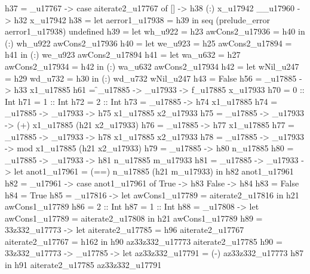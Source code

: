          h37 = _u17767 -> case aiterate2_u17767 of
                                      [] -> h38
                                      (:) x_u17942 __u17960 -> h32 x_u17942
         h38 = let aerror1_u17938 = h39
               in seq (prelude_error aerror1_u17938) undefined
         h39 = let
                 wh_u922 = h23
                 awCons2_u17936 = h40
               in (:) wh_u922 awCons2_u17936
         h40 = let
                 we_u923 = h25
                 awCons2_u17894 = h41
               in (:) we_u923 awCons2_u17894
         h41 = let
                 wa_u632 = h27
                 awCons2_u17934 = h42
               in (:) wa_u632 awCons2_u17934
         h42 = let
                 wNil_u247 = h29
                 wd_u732 = h30
               in (:) wd_u732 wNil_u247
         h43 = False
         h56 = _u17885 -> h33 x1_u17885
         h61 = \f_u17885 -> \x_u17933 -> f_u17885 x_u17933
         h70 = 0 :: Int
         h71 = 1 :: Int
         h72 = 2 :: Int
         h73 = _u17885 -> h74 x1_u17885
         h74 = _u17885 -> _u17933 -> h75 x1_u17885 x2_u17933
         h75 = _u17885 -> _u17933 -> (+) x1_u17885 (h21 x2_u17933)
         h76 = _u17885 -> h77 x1_u17885
         h77 = _u17885 -> _u17933 -> h78 x1_u17885 x2_u17933
         h78 = _u17885 -> _u17933 -> mod x1_u17885 (h21 x2_u17933)
         h79 = \n_u17885 -> h80 n_u17885
         h80 = \n_u17885 -> \m_u17933 -> h81 n_u17885 m_u17933
         h81 = \n_u17885 -> \m_u17933 -> let
                                           anot1_u17961 = (==) n_u17885 (h21 m_u17933)
                                         in h82 anot1_u17961
         h82 = _u17961 -> case anot1_u17961 of
                                  True -> h83
                                  False -> h84
         h83 = False
         h84 = True
         h85 = _u17816 -> let awCons1_u17789 = aiterate2_u17816
                                    in h21 awCons1_u17789
         h86 = 2 :: Int
         h87 = 1 :: Int
         h88 = _u17808 -> let awCons1_u17789 = aiterate2_u17808
                                    in h21 awCons1_u17789
         h89 = \az33z332_u17773 -> let
                                     aiterate2_u17785 = h96 aiterate2_u17767
                                     aiterate2_u17767 = h162
                                   in h90 az33z332_u17773 aiterate2_u17785
         h90 = \az33z332_u17773 -> _u17785 -> let
                                                          az33z332_u17791 = (-) az33z332_u17773 h87
                                                        in h91 aiterate2_u17785 az33z332_u17791
